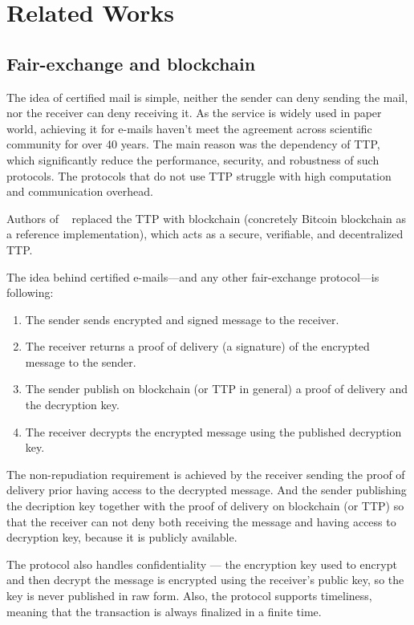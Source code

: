 \documentclass{ieeeaccess}
\begin{document}
\section{Related Works}\label{sec:related-works}

\subsection{Fair-exchange and blockchain}
The idea of certified mail is simple, neither the sender can deny sending the mail, nor the receiver can deny receiving it. As the service is widely used in paper world, achieving it for e-mails haven't meet the agreement across scientific community for over 40 years. The main reason was the dependency of TTP, which significantly reduce the performance, security, and robustness of such protocols. The protocols that do not use TTP struggle with high computation and communication overhead.

Authors of ~\cite{hinarejos2019solution} replaced the TTP with blockchain (concretely Bitcoin blockchain as a reference implementation), which acts as a secure, verifiable, and decentralized TTP.

The idea behind certified e-mails—and any other fair-exchange protocol—is following:
\begin{enumerate}
    \item The sender sends encrypted and signed message to the receiver.
    \item The receiver returns a proof of delivery (a signature) of the encrypted message to the sender.
    \item The sender publish on blockchain (or TTP in general) a proof of delivery and the decryption key.
    \item The receiver decrypts the encrypted message using the published decryption key.
\end{enumerate}

The non-repudiation requirement is achieved by the receiver sending the proof of delivery prior having access to the decrypted message. And the sender publishing the decription key together with the proof of delivery on blockchain (or TTP) so that the receiver can not deny both receiving the message and having access to decryption key, because it is publicly available.

The protocol also handles confidentiality — the encryption key used to encrypt and then decrypt the message is encrypted using the receiver's public key, so the key is never published in raw form.
Also, the protocol supports timeliness, meaning that the transaction is always finalized in a finite time.
\end{document}
